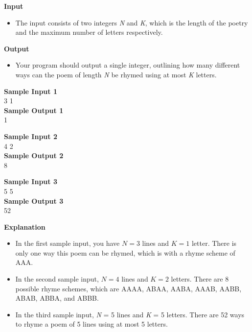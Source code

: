 \documentclass{article}
\begin{document}
\textbf{Input}
\begin{itemize}
	\item The input consists of two integers \emph{N} and \emph{K}, which is the length of the poetry and the maximum number of letters respectively.
\end{itemize} 

\textbf{Output}
\begin{itemize}
	\item Your program should output a single integer, outlining how many different ways can the poem of length \emph{N} be rhymed using at most \emph{K} letters. \\
\end{itemize} 

\begin{minipage} [b] {0.333\textwidth}
	\textbf{Sample Input 1} \\
	3 1\\

	\textbf{Sample Output 1} \\
	1 \\
\end{minipage} %
\begin{minipage} [b] {0.333\textwidth}
	\textbf{Sample Input 2} \\
	4 2\\

	\textbf{Sample Output 2} \\
	8 \\
\end{minipage} %
\begin{minipage} [b] {0.333\textwidth}
	\textbf{Sample Input 3} \\
	5 5\\

	\textbf{Sample Output 3} \\
	52 \\
\end{minipage}

\textbf{Explanation}
\begin{itemize}
	\item In the first sample input, you have $N = 3$ lines and $K = 1$ letter. There is only one way this poem can be rhymed, which is with a rhyme scheme of AAA. 
	\item In the second sample input, $N = 4$ lines and $K = 2$ letters. There are 8 possible rhyme schemes, which are AAAA, ABAA, AABA, AAAB, AABB, ABAB, ABBA, and ABBB.
	\item In the third sample input, \emph{N} = 5 lines and \emph{K} = 5 letters. There are 52 ways to rhyme a poem of 5 lines using at most 5 letters.\\
\end{itemize}
\end{document}

